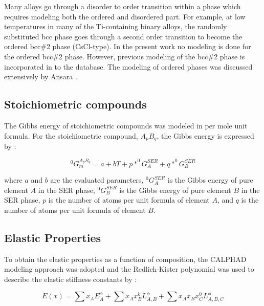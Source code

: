 Many alloys go through a disorder to order transition within a phase which requires modeling both the ordered and disordered part. For example, at low temperatures in many of the Ti-containing binary alloys, the randomly substituted bcc phase goes through a second order transition to become the ordered bcc\#2 phase (CsCl-type). In the present work no modeling is done for the ordered bcc\#2 phase. However, previous modeling of the bcc\#2 phase is incorporated in to the database. The modeling of ordered phases was discussed extensively by Ansara \cite{Ansara1998}. 

\subsection{Stoichiometric compounds}

The Gibbs energy of stoichiometric compounds was modeled in per mole unit formula. For the stoichiometric compound, $A_{p}B_{q}$, the Gibbs energy is expressed by \cite{Zacherl2012}: 

\begin{equation}
\label{eq: stoichiometric}
^{0}G_{m}^{A_{p}B_{q}} = a + bT + p * ^{0}G_{A}^{SER} + q * ^{0}G_{B}^{SER}
\end{equation}

\noindent where $a$ and $b$ are the evaluated parameters, $^{0}G_{A}^{SER}$ is the Gibbs energy of pure element $A$ in the SER phase, $^{0}G_{B}^{SER}$ is the Gibbs energy of pure element $B$ in the SER phase, $p$ is the number of atoms per unit formula of element $A$, and $q$ is the number of atoms per unit formula of element $B$.

\subsection{Elastic Properties}

To obtain the elastic properties as a function of composition, the CALPHAD modeling approach was adopted and the Redlich-Kister polynomial was used to describe the elastic stiffness constants by \cite{Redlich1948b,Liu2009,Lukas2007,Liu2010}: 

\begin{equation}
\label{eq: elastic}
E(x) = \sum x_{A} E_{A}^{\phi} + \sum x_{A} x_{B} ^{k}L_{A,B}^{\phi} + \sum x_{A} x_{B} x_{C} ^{0}L_{A, B, C}^{\phi}
\end{equation}

